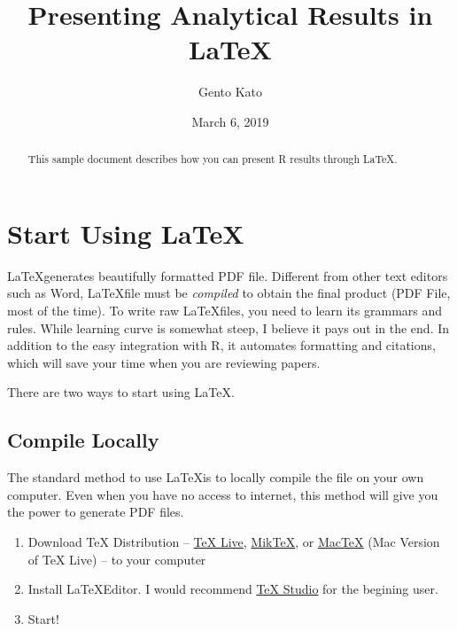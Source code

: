 \documentclass[letterpaper, 12pt]{article}
\title{Presenting Analytical Results in \LaTeX}
\author{Gento Kato}
\affil{University of California, Davis}
\date{March 6, 2019}
\begin{document}
    

    \maketitle

    \begin{abstract}
        This sample document describes how you can present R results through \LaTeX.
    \end{abstract}

    \section{Start Using \LaTeX}

    \par \LaTeX generates beautifully formatted PDF file. Different from other text editors such as Word, \LaTeX file must be  \textit{compiled} to obtain the final product (PDF File, most of the time). To write raw \LaTeX files, you need to learn its grammars and rules. While learning curve is somewhat steep, I believe it pays out in the end. In addition to the easy integration with R, it automates formatting and citations, which will save your time when you are reviewing papers. 
    
    \par There are two ways to start using \LaTeX.

    \subsection{Compile Locally}

    \par The standard method to use \LaTeX is to locally compile the file on your own computer. Even when you have no access to internet, this method will give you the power to generate PDF files.

    \begin{enumerate}
        \item Download TeX Distribution -- \href{https://www.tug.org/texlive/acquire-netinstall.html}{TeX Live}, \href{https://miktex.org/download}{MikTeX}, or \href{http://www.tug.org/mactex/mactex-download.html}{MacTeX} (Mac Version of TeX Live) -- to your computer
        \item Install \LaTeX Editor. I would recommend \href{https://www.texstudio.org}{TeX Studio} for the begining user.
        \item Start!
    \end{enumerate}
\end{document}
